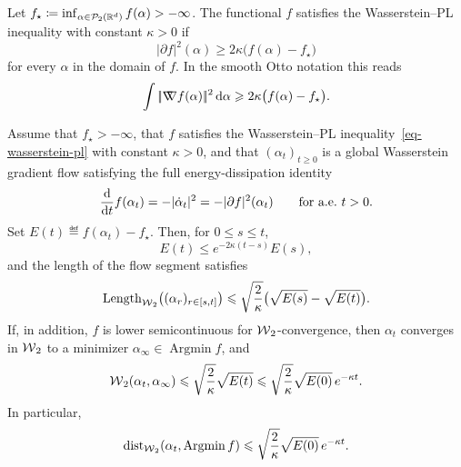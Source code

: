 \begin{defn}\label{def-wasserstein-pl}
	Let \(f_\star\coloneqq\inf_{\alpha\in\mathcal{P}_2(\mathbb{R}^d)} f(\alpha)>-\infty\). The functional \(f\) satisfies the Wasserstein--PL inequality with constant \(\kappa>0\) if
	\begin{equation}\label{eq-wasserstein-pl}
		|\partial f|^2(\alpha)
		\geq
		2\kappa\bigl(f(\alpha)-f_\star\bigr)
	\end{equation}
	for every \(\alpha\) in the domain of \(f\). In the smooth Otto notation this reads
	\[
		\int|\!| \mathord{\nabla\mkern-9.3mu\nabla} f(\alpha) |\!|^2\,\mathrm{d}\alpha
		\geqslant
		2\kappa\bigl(f(\alpha)-f_\star\bigr).
	\]
\end{defn}

\begin{thm}\label{thm-wasserstein-pl-convergence}
	Assume that \(f_\star>-\infty\), that \(f\) satisfies the Wasserstein--PL inequality~\eqref{eq-wasserstein-pl} with constant \(\kappa>0\), and that \((\alpha_t)_{t\geq0}\) is a global Wasserstein gradient flow satisfying the full energy-dissipation identity
	\begin{equation}\label{eq-full-wasserstein-energy-dissipation}
		\frac{\mathrm{d}}{\mathrm{d} t}f(\alpha_t)
		=
		-|\dot\alpha_t|^2
		=
		-|\partial f|^2(\alpha_t)
		\qquad\text{for a.e.\ }t>0.
	\end{equation}
	Set \(E(t)\eqdef f(\alpha_t)-f_\star\). Then, for \(0\leq s\leq t\),
	\[
		E(t)\leq e^{-2\kappa(t-s)}E(s),
	\]
	and the length of the flow segment satisfies
	\[
		\operatorname{Length}_{\operatorname{\mathcal{W}}_2}\bigl((\alpha_r)_{r\in[s,t]}\bigr)
		\leqslant
		\sqrt{\frac{2}{\kappa}}\bigl(\sqrt{E(s)}-\sqrt{E(t)}\bigr).
	\]
	If, in addition, \(f\) is lower semicontinuous for \(\operatorname{\mathcal{W}}_2\)-convergence, then \(\alpha_t\) converges in \(\operatorname{\mathcal{W}}_2\) to a minimizer \(\alpha_\infty\in\operatorname{Argmin} f\), and
	\[
		\operatorname{\mathcal{W}}_2(\alpha_t,\alpha_\infty)
		\leqslant
		\sqrt{\frac{2}{\kappa}}\sqrt{E(t)}
		\leqslant
		\sqrt{\frac{2}{\kappa}}\sqrt{E(0)}\,e^{-\kappa t}.
	\]
	In particular,
	\[
		\operatorname{dist}_{\operatorname{\mathcal{W}}_2}(\alpha_t,\operatorname{Argmin}f)
		\leqslant
		\sqrt{\frac{2}{\kappa}}\sqrt{E(0)}\,e^{-\kappa t}.
	\]
\end{thm}

